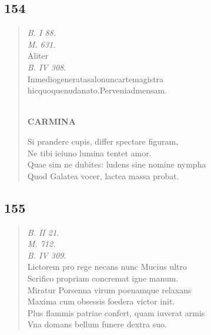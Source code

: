 \documentclass[11pt, a4paper]{report}
\begin{document}
            \subsection*{154}
      \begin{verse}
      \textit{B. I 88.} \\ \textit{M. 631.} \\ Aliter \\ \textit{B. IV 308.} \\ Inmediogeneratasalonuncartemagistra \\ hicquoquenudanato.Perveniadmensam. \\ 
        ﻿\pagebreak 
     \marginpar{[146]} \begin{center} \textbf{CARMINA} \end{center}Si prandere cupis, differ spectare figuram, \\ Ne tibi ieiuno lumina tentet amor. \\ Quae sim ne dubites: ludens sine nomine nympha \\ Quod Galatea vocer, lactea massa probat. \\ 
      \end{verse}
  
            \subsection*{155}
      \begin{verse}
      \textit{B. II 21.} \\ \textit{M. 712.} \\ \textit{B. IV 309.} \\ Lictorem pro rege necans nunc Mucius ultro \\ Scrifico propriam concremat igne manum. \\ Miratur Porsenna virum poenamque relaxans \\ Maxima cum obsessis foedera victor init. \\ Plus flammis patriae confert, quam iuverat armis \\ Vna domans bellum funere dextra suo. \\ 
      \end{verse}
  
\end{document}
